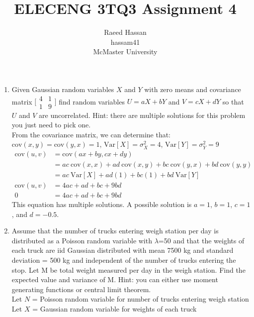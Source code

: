 \documentclass[12pt]{article}
\title{ELECENG 3TQ3 Assignment 4}
\author{Raeed Hassan \\ hassam41 \\ McMaster University}
\begin{document}
\maketitle
\pagebreak
\begin{enumerate}
    \item Given Gaussian random variables $X$ and $Y$ with zero means and covariance matrix $\big[\begin{smallmatrix} 4 & 1\\ 1 & 9 \end{smallmatrix}\big]$ find random variables $U=aX+bY$ and $V=cX+dY$ so that $U$ and $V$ are uncorrelated. Hint: there are multiple solutions for this problem you just need to pick one. \\
    From the covariance matrix, we can determine that: \\ $\text{cov}(x,y) = \text{cov}(y,x) = 1$, $\text{Var}[X] = \sigma^2_X = 4$, $\text{Var}[Y] = \sigma^2_Y = 9$ \\
    \begin{equation*}
    \begin{aligned}
        \text{cov}(u,v) &= \text{cov}(ax + by, cx + dy) \\
        &= ac~\text{cov}(x, x) + ad~\text{cov}(x, y) + bc~\text{cov}(y, x) + bd~\text{cov}(y, y) \\
        &= ac~\text{Var}[X] + ad(1) + bc(1) + bd~\text{Var}[Y] \\
        \text{cov}(u,v) &= 4ac + ad + bc + 9bd \\
        0 &= 4ac + ad + bc + 9bd
    \end{aligned}
    \end{equation*}
    This equation has multiple solutions. A possible solution is $a = 1$, $b = 1$, $c = 1$, and $d = -0.5$.
    \item Assume that the number of trucks entering weigh station per day is distributed as a Poisson random variable with $\lambda$=50 and that the weights of each truck are iid Gaussian distributed with mean 7500 kg and standard deviation = 500 kg and independent of the number of trucks entering the stop. Let M be total weight measured per day in the weigh station. Find the expected value and variance of M. Hint: you can either use moment generating functions or central limit theorem. \\
    Let $N$ = Poisson random variable for number of trucks entering weigh station \\
    Let $X$ = Gaussian random variable for weights of each truck 
    \begin{equation*}

\end{equation*}
\end{enumerate}
\end{document}
